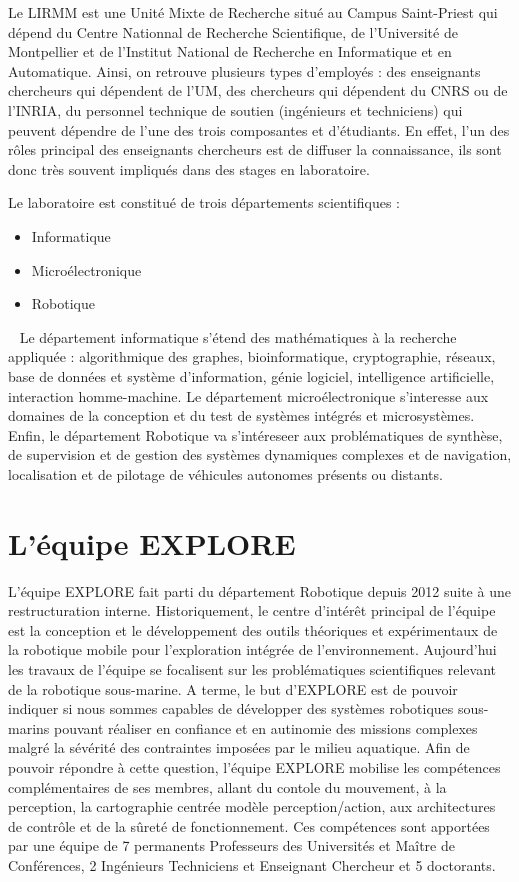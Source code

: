 \documentclass[11pt,french,a4paper]{report}
\begin{document}
Le LIRMM est une Unité Mixte de Recherche situé au Campus Saint-Priest qui dépend du Centre Nationnal de Recherche Scientifique, de l'Université de Montpellier
et de l'Institut National de Recherche en Informatique et en Automatique. 
Ainsi, on retrouve plusieurs types d'employés : des enseignants chercheurs qui dépendent de l'UM, des chercheurs qui dépendent du CNRS
ou de l'INRIA, du personnel technique de soutien (ingénieurs et techniciens) qui peuvent dépendre de l'une des trois composantes et 
d'étudiants. En effet, l'un des rôles principal des enseignants chercheurs est de diffuser la connaissance, ils sont donc très souvent 
impliqués dans des stages en laboratoire. 

Le laboratoire est constitué de trois départements scientifiques : 
\begin{itemize}
    \item Informatique
    \item Microélectronique
    \item Robotique
\end{itemize} 
Le département informatique s'étend des mathématiques à la recherche appliquée : algorithmique des graphes, bioinformatique,
cryptographie, réseaux, base de données et système d'information, génie logiciel, intelligence artificielle, interaction homme-machine.
Le département microélectronique s'interesse aux domaines de la conception et du test de systèmes intégrés et microsystèmes.
Enfin, le département Robotique va s'intéreseer aux problématiques de synthèse, de supervision et de gestion des systèmes dynamiques
complexes et de navigation, localisation et de pilotage de véhicules autonomes présents ou distants. 

\section{L'équipe EXPLORE}
L'équipe EXPLORE fait parti du département Robotique depuis 2012 suite à une restructuration interne.
Historiquement, le centre d'intérêt principal de l'équipe est la conception et le développement des outils 
théoriques et expérimentaux de la robotique mobile pour l'exploration intégrée de l'environnement.
Aujourd'hui les travaux de l'équipe se focalisent sur les problématiques scientifiques relevant de 
la robotique sous-marine. A terme, le but d'EXPLORE est de pouvoir indiquer si nous sommes capables de 
développer des systèmes robotiques sous-marins pouvant réaliser en confiance et en autinomie des missions
complexes malgré la sévérité des contraintes imposées par le milieu aquatique. 
Afin de pouvoir répondre à cette question, l'équipe EXPLORE mobilise les compétences complémentaires de ses membres, 
allant du contole du mouvement, à la perception, la cartographie centrée modèle perception/action, aux architectures 
de contrôle et de la sûreté de fonctionnement. 
Ces compétences sont apportées par une équipe de 7 permanents Professeurs des Universités et Maître de Conférences, 2 Ingénieurs Techniciens 
et Enseignant Chercheur et 5 doctorants. 
\end{document}
